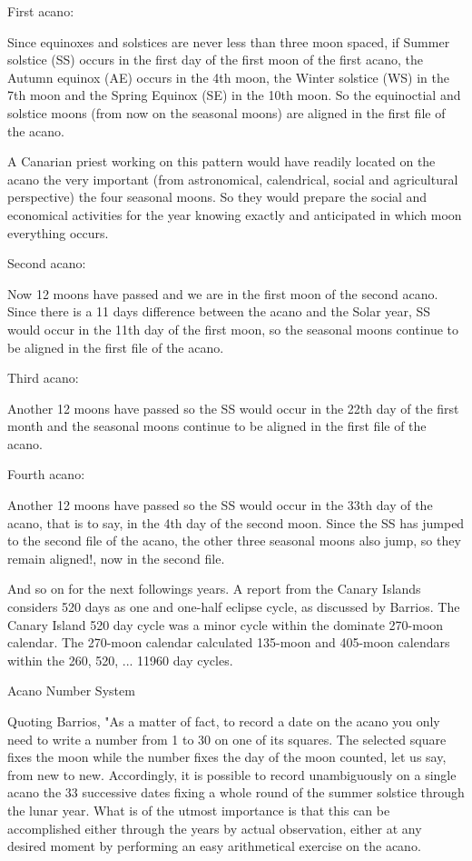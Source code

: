 \documentclass[12pt]{article}
\begin{document}
First acano:

Since equinoxes and solstices are never less than three moon spaced, if Summer solstice (SS) occurs in the first day of the first moon of the first acano, the Autumn equinox (AE) occurs in the 4th moon, the Winter solstice (WS) in the 7th moon and the Spring Equinox (SE) in the 10th moon. So the equinoctial and solstice moons (from now on the seasonal moons) are aligned in the first file of the acano.

A Canarian priest working on this pattern would have readily located on the acano the very important (from astronomical, calendrical, social and agricultural perspective) the four seasonal moons. So they would prepare the social and economical activities for the year knowing exactly and anticipated in which moon everything occurs.

Second acano:

Now 12 moons have passed and we are in the first moon of the second acano. Since there is a 11 days difference between the acano and the Solar year, SS would occur in the 11th day of the first moon, so the seasonal moons continue to be aligned in the first file of the acano.

Third acano:

Another 12 moons have passed so the SS would occur in the 22th day of the first month and  the seasonal moons continue to be aligned in the first file of the acano.

Fourth acano:

Another 12 moons have passed so the SS would occur in the 33th day of the acano, that is to say, in the 4th day of the second moon. Since the SS has jumped to the second file of the acano, the other three seasonal moons also jump, so they remain aligned!, now in the second file.

And so on for the next followings years.  A report from the Canary Islands considers 520 days as one and one-half eclipse cycle, as discussed by Barrios.  The Canary Island 520 day cycle was a minor cycle within the dominate 270-moon calendar. The 270-moon calendar calculated 135-moon and 405-moon calendars within the 260, 520, ... 11960 day cycles. 

Acano Number System

Quoting Barrios, "As a matter of fact, to record a date on the acano you only need to write a number from 1 to 30 on one of its squares. The selected square fixes the moon while the number fixes the day of the moon counted, let us say, from new to new. Accordingly, it is possible to record unambiguously on a single acano the 33 successive dates fixing a whole round of the summer solstice through the lunar year. What is of the utmost importance is that this can be accomplished either through the years by actual observation, either at any desired moment by performing an easy arithmetical exercise on the acano. 
\end{document}
